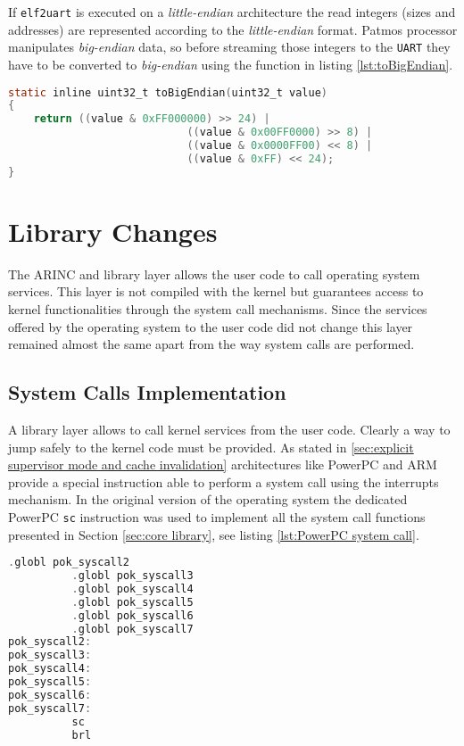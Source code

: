 If \texttt{elf2uart} is executed on a \textit{little-endian} architecture the read integers (sizes and addresses) are represented according to the \textit{little-endian} format. Patmos processor manipulates \textit{big-endian} data, so before streaming those integers to the \texttt{UART} they have to be converted to \textit{big-endian} using the function in listing \ref{lst:toBigEndian}.

\begin{lstlisting}[language=C, caption=Functions converting \textit{small-endian} integers to \textit{big-endian} integers, label=lst:toBigEndian]
static inline uint32_t toBigEndian(uint32_t value)
{
	return ((value & 0xFF000000) >> 24) | 
							((value & 0x00FF0000) >> 8) |
							((value & 0x0000FF00) << 8) |
							((value & 0xFF) << 24);
}
\end{lstlisting}

\section{Library Changes}

The ARINC and library layer allows the user code to call operating system services. This layer is not compiled with the kernel but guarantees access to kernel functionalities through the system call mechanisms. Since the services offered by the operating system to the user code did not change this layer remained almost the same apart from the way system calls are performed.

\subsection{System Calls Implementation}

A library layer allows to call kernel services from the user code. Clearly a way to jump safely to the kernel code must be provided. As stated in \ref{sec:explicit supervisor mode and cache invalidation} architectures like PowerPC and ARM provide a special instruction able to perform a system call using the interrupts mechanism. In the original version of the operating system the dedicated PowerPC \texttt{sc} instruction was used to implement all the system call functions presented in Section \ref{sec:core library}, see listing \ref{lst:PowerPC system call}.

\begin{lstlisting}[language=C, caption=PowerPC system call implementation, label=lst:PowerPC system call]
		  .globl pok_syscall2
		  .globl pok_syscall3
		  .globl pok_syscall4
		  .globl pok_syscall5
		  .globl pok_syscall6 
		  .globl pok_syscall7 
pok_syscall2:
pok_syscall3:
pok_syscall4:
pok_syscall5:
pok_syscall6:	
pok_syscall7:
		  sc
		  brl
\end{lstlisting}

